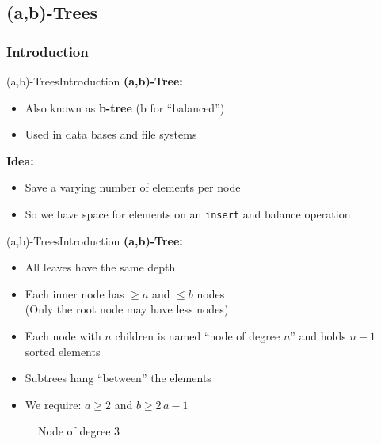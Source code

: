 \subsection{(a,b)-Trees}
\subsubsection{Introduction}

\begin{frame}{(a,b)-Trees}{Introduction}
  \textbf{(a,b)-Tree:}
  \begin{itemize}
    \item
      Also known as \textbf{b-tree} (b for \enquote{balanced})
    \item
      Used in data bases and file systems
  \end{itemize}
  \textbf{Idea:}
  \begin{itemize}
    \item
      Save a varying number of elements per node
    \item
      So we have space for elements on an \texttt{\color{Mittel-Blau}insert}
      and balance operation
  \end{itemize}
\end{frame}


\begin{frame}{(a,b)-Trees}{Introduction}
  \textbf{(a,b)-Tree:}
  \begin{itemize}
    \item
      All leaves have the same depth
    \item
      Each inner node has {\color{Mittel-Blau}$\geq a$} and
      {\color{Mittel-Blau}$\leq b$} nodes\\
      (Only the root node may have less nodes)
    \item
      Each node with $n$ children is named \enquote{node of degree $n$} and
      holds $n-1$ sorted elements
    \item
      Subtrees hang \enquote{between} the elements
    \item
      We require: {\color{Mittel-Blau}$a \geq 2$} and
      {\color{Mittel-Blau}$b \geq 2\,a - 1$}
  \end{itemize}
  \begin{figure}
    \begin{adjustbox}{width=0.3\linewidth}
      
    \end{adjustbox}
    \caption{Node of degree 3}
    \label{fig:a_b_tree:node_introduction}
  \end{figure}
\end{frame}


